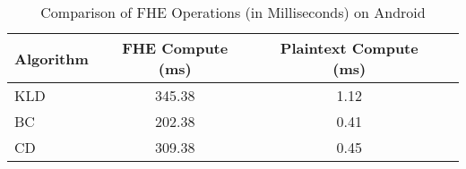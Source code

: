 \begin{table}[t]
\caption{Comparison of FHE Operations (in Milliseconds) on Android}
\centering
\begin{tabular}{|l|c|c|c|}
\hline
\textbf{Algorithm} & \textbf{FHE Compute (ms)} & \textbf{Plaintext Compute (ms)} \\
\hline
KLD & 345.38 & 1.12 \\
BC  & 202.38 & 0.41 \\
CD  & 309.38 & 0.45 \\
\hline
\end{tabular}
\label{table:fhe_operations}
\end{table}
